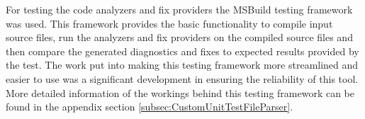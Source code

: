 For testing the code analyzers and fix providers the MSBuild testing framework was used. This framework provides the basic functionality to compile input source files, run the analyzers and fix providers on the compiled source files and then compare the generated diagnostics and fixes to expected results provided by the test.
The work put into making this testing framework more streamlined and easier to use was a significant development in ensuring the reliability of this tool. More detailed information of the workings behind this testing framework can be found in the appendix section \ref{subsec:CustomUnitTestFileParser}.


